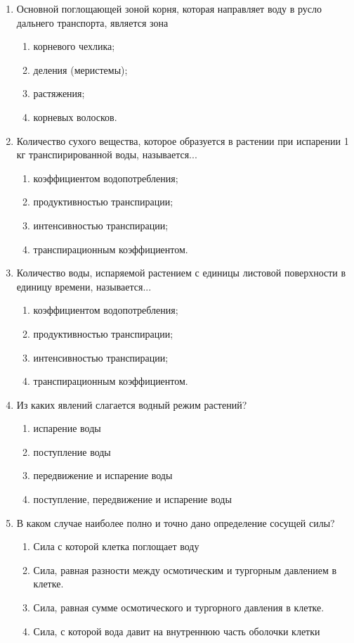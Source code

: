 \begin{enumerate}
\item Основной поглощающей зоной корня, которая направляет воду в русло дальнего транспорта,  является зона 
\begin{enumerate}
	\item корневого чехлика; 
	\item деления (меристемы); 
	\item растяжения; 
	\item корневых волосков.
\end{enumerate}

\item Количество сухого вещества, которое образуется в растении при испарении 1 кг транспирированной воды, называется...
\begin{enumerate}
	\item коэффициентом водопотребления; 
	\item продуктивностью транспирации;
	\item интенсивностью транспирации;  
	\item транспирационным коэффициентом.
\end{enumerate}

\item Количество воды, испаряемой растением с единицы листовой поверхности в единицу времени, называется...
\begin{enumerate}
	\item коэффициентом водопотребления; 
	\item продуктивностью транспирации;
	\item интенсивностью транспирации;  
	\item транспирационным коэффициентом.
\end{enumerate}

\item Из каких явлений слагается водный режим растений?
\begin{enumerate}
	\item испарение воды
	\item поступление воды
	\item передвижение и испарение воды
	\item поступление, передвижение и испарение воды
\end{enumerate}

\item В каком случае наиболее полно и точно дано определение сосущей силы?
\begin{enumerate}
	\item Сила с которой клетка поглощает воду
	\item Сила, равная разности между осмотическим и тургорным давлением в клетке.
	\item Сила, равная сумме осмотического  и тургорного давления в клетке.
	\item Сила, с которой вода давит на внутреннюю часть оболочки клетки
\end{enumerate}


\end{enumerate}
